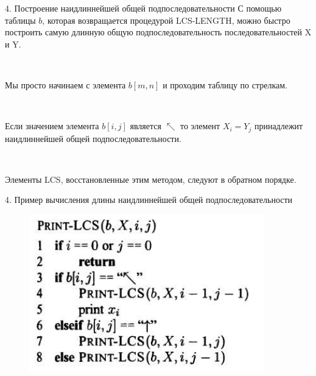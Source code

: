 \documentclass{beamer}
\begin{document}
\begin{frame}{4. Построение наидлиннейшей общей подпоследовательности}
    С помощью таблицы $b$, которая возвращается процедурой LCS-LENGTH, можно быстро построить самую длинную общую подпоследовательность последовательностей X и Y.
    
    ~
    
    Мы просто начинаем с элемента $b[m, n]$ и проходим таблицу по стрелкам. 
    
    ~
    
    Если значением элемента $b[i,j]$ является $\nwarrow$ то элемент $X_i=Y_j$ принадлежит наидлиннейшей общей подпоследовательности. 
    
    ~
    
    Элементы LCS, восстановленные этим методом, следуют в обратном порядке. 
\end{frame}

\begin{frame}{4. Пример вычисления длины наидлиннейшей общей подпоследовательности}
     \begin{figure}[h]
		\centering
		\includegraphics[scale=0.6]{images/lec09-pic23.png}
	\end{figure}
\end{frame}
\end{document}

